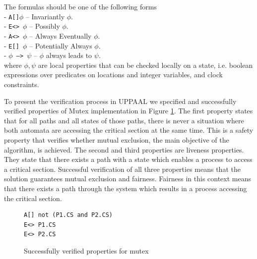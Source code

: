 \begin{definition}
The formulas should be one of the following forms\\
- \texttt{A[]$\phi$} -- Invariantly $\phi$.\\
- \texttt{E<> $\phi$} -- Possibly $\phi$.\\
- \texttt{A<> $\phi$} -- Always Eventually $\phi$.\\
- \texttt{E[] $\phi$} -- Potentially Always $\phi$.\\
- \texttt{$\phi$ --> $\psi$} -- $\phi$ always leads to $\psi$.\\
where $\phi, \psi$ are local properties that can be checked locally on a state, i.e. boolean expressions over predicates on locations and integer variables, and clock constraints.
\label{def:quantifiers}
\end{definition}

\noindent
To present the verification process in UPPAAL we specified and successfully verified properties of Mutex implementation in Figure \ref{fig:mutex_verification}. The first property states that for all paths and all states of those paths, there is never a situation where both automata are accessing the critical section at the same time. This is a safety property that verifies whether mutual exclusion, the main objective of the algorithm, is achieved. The second and third properties are liveness properties. They state that there exists a path with a state which enables a process to access a critical section. Successful verification of all three properties means that the solution guarantees mutual exclusion and fairness. Fairness in this context means that there exists a path through the system which results in a process accessing the critical section.

\begin{figure}[H]
\caption{Successfully verified properties for mutex \cite{SmallTutorial2009}}
\label{fig:mutex_verification}
\begin{lstlisting}[style=code]
A[] not (P1.CS and P2.CS)
E<> P1.CS
E<> P2.CS
\end{lstlisting}    
\end{figure}
